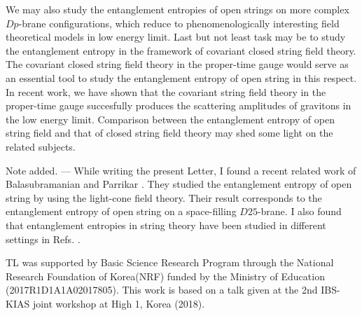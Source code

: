 \documentclass[aps,showpacs,showkeys]{revtex4}
\begin{document}
We may also study the entanglement entropies of open strings on more complex $Dp$-brane configurations,
which reduce to phenomenologically interesting field theoretical models in low energy limit.
Last but not least task may be to study the entanglement entropy in the
framework of covariant closed string field theory. 
The covariant closed string field theory in the proper-time gauge \cite{Lee2018EPJ} would serve as an essential tool to study the entanglement entropy of open string in this respect. 
In recent work, we have shown that the covariant string field theory in the proper-time gauge 
succesfully produces the scattering amplitudes of gravitons in the low energy limit. Comparison between  
the entanglement entropy of open string field and that of closed string field theory may shed some 
light on the related subjects. 

Note added. --- While writing the present Letter, I found a recent related work of Balasubramanian and Parrikar \cite{Balasubramanian2018}.
They studied the entanglement entropy of open string by using the light-cone field theory. Their result corresponds to the entanglement entropy of open string on a space-filling $D25$-brane. I also found that entanglement entropies in string theory have been studied in different settings in Refs. \cite{S.He2015,Zayas2015,Zayas2016}.





\vskip 1cm

\begin{acknowledgments}

TL was supported by Basic Science Research Program through the National Research Foundation of Korea(NRF) funded by the Ministry of Education (2017R1D1A1A02017805). This work is based on a talk given at the 2nd 
IBS-KIAS joint workshop at High 1, Korea (2018).

\end{acknowledgments}
\end{document}
